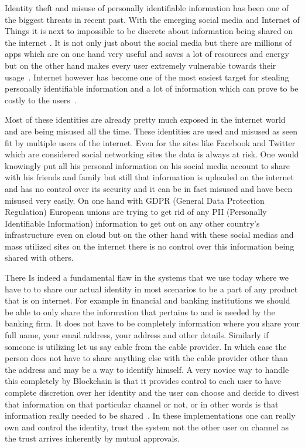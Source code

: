 Identity theft and misuse of personally identifiable information has
been one of the biggest threats in recent past. With the emerging
social media and Internet of Things it is next to impossible to be
discrete about information being shared on the internet
\cite{reuters20}. It is not only just about the social media but there
are millions of apps which are on one hand very useful and saves a lot
of resources and energy but on the other hand makes every user
extremely vulnerable towards their usage~\cite{statista21}. Internet
however has become one of the most easiest target for stealing
personally identifiable information and a lot of information which can
prove to be costly to the users~\cite{hedayati22}.

Most of these identities are already pretty much exposed in the
internet world and are being misused all the time. These identities
are used and misused as seen fit by multiple users of the internet.
Even for the sites like Facebook and Twitter which are considered
social networking sites the data is always at risk. One would
knowingly put all his personal information on his social media account
to share with his friends and family but still that information is
uploaded on the internet and has no control over its security and it
can be in fact misused and have been misused very easily. On one hand
with GDPR (General Data Protection Regulation)\cite{gdpr10} European 
unions are trying to get rid of any PII\cite{pii9} (Personally 
Identifiable Information) information to get out on any other country's
infrastructure even on cloud but on the other hand with these social
medias and mass utilized sites on the internet there is no control over
this information being shared with others.


There Is indeed a fundamental flaw in the systems that we use today
where we have to to share our actual identity in most scenarios to be
a part of any product that is on internet. For example in financial
and banking institutions we should be able to only share the
information that pertains to and is needed by the banking firm. It
does not have to be completely information where you share your full
name, your email address, your address and other details. Similarly if
someone is utilizing let us say cable from the cable provider. In which
case the person does not have to share anything else with the cable 
provider other than the address and may be a way to identify himself.
A very novice way to handle this completely by Blockchain is 
that it provides control to each user to have 
complete discretion over her identity and
the user can choose and decide to divest that information on that
particular channel or not, or in other words is that information
really needed to be shared~\cite{alex23}. In these implementations one
can really own and control the identity, trust the system not the
other user on channel as the trust arrives inherently by mutual
approvals.


